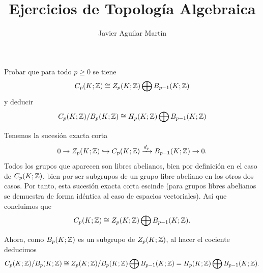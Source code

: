 \documentclass[twoside]{article}
\begin{document}
\title{Ejercicios de Topología Algebraica}
\author{Javier Aguilar Martín}
\maketitle

\begin{ejercicio}{1}
Probar que para todo $p\geq 0$ se tiene 
\[
C_p(K;\mathbb{Z})\cong Z_p(K;\mathbb{Z})\bigoplus B_{p-1}(K;\mathbb{Z})
\]
y deducir 
\[
C_p(K;\mathbb{Z})/B_p(K;\mathbb{Z})\cong H_p(K;\mathbb{Z})\bigoplus B_{p-1}(K;\mathbb{Z})
\]
\end{ejercicio}
\begin{solucion}
Tenemos la sucesión exacta corta
\[
0\to Z_p(K;\mathbb{Z})\hookrightarrow C_p(K;\mathbb{Z})\xrightarrow{d_p} B_{p-1}(K;\mathbb{Z})\to 0.
\]
Todos los grupos que aparecen son libres abelianos, bien por definición en el caso de $C_p(K;\mathbb{Z})$, bien por ser subgrupos de un grupo libre abeliano en los otros dos casos. Por tanto, esta sucesión exacta corta escinde (para grupos libres abelianos se demuestra de forma idéntica al caso de espacios vectoriales). Así que concluimos que 
\[
C_p(K;\mathbb{Z})\cong Z_p(K;\mathbb{Z})\bigoplus B_{p-1}(K;\mathbb{Z}).
\]

Ahora, como $B_p(K;\mathbb{Z})$ es un subgrupo de $Z_p(K;\mathbb{Z})$, al hacer el cociente deducimos
\[
C_p(K;\mathbb{Z})/B_p(K;\mathbb{Z})\cong Z_p(K;\mathbb{Z})/B_p(K;\mathbb{Z})\bigoplus B_{p-1}(K;\mathbb{Z})=H_p(K;\mathbb{Z})\bigoplus B_{p-1}(K;\mathbb{Z}).
\]
\end{solucion}

\newpage
\end{document}
